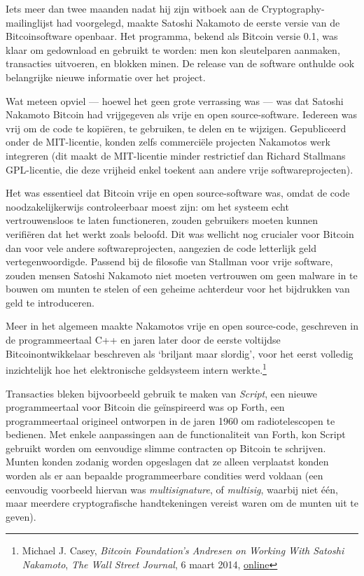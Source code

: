 \documentclass[
  a5paper,
  smalldemyvopaper,11pt,twoside,onecolumn,openright,extrafontsizes,
hidelinks]{memoir}
\begin{document}
Iets meer dan twee maanden nadat hij zijn witboek aan de
Cryptography-mailinglijst had voorgelegd, maakte Satoshi Nakamoto de
eerste versie van de Bitcoinsoftware openbaar. Het programma, bekend als
Bitcoin versie 0.1, was klaar om gedownload en gebruikt te worden: men
kon sleutelparen aanmaken, transacties uitvoeren, en blokken minen. De
release van de software onthulde ook belangrijke nieuwe informatie over
het project.

Wat meteen opviel --- hoewel het geen grote verrassing was --- was dat
Satoshi Nakamoto Bitcoin had vrijgegeven als vrije en open
source-software. Iedereen was vrij om de code te kopiëren, te gebruiken,
te delen en te wijzigen. Gepubliceerd onder de MIT-licentie, konden
zelfs commerciële projecten Nakamotos werk integreren (dit maakt de
MIT-licentie minder restrictief dan Richard Stallmans GPL-licentie, die
deze vrijheid enkel toekent aan andere vrije softwareprojecten).

Het was essentieel dat Bitcoin vrije en open source-software was, omdat
de code noodzakelijkerwijs controleerbaar moest zijn: om het systeem
echt vertrouwensloos te laten functioneren, zouden gebruikers moeten
kunnen verifiëren dat het werkt zoals beloofd. Dit was wellicht nog
crucialer voor Bitcoin dan voor vele andere softwareprojecten, aangezien
de code letterlijk geld vertegenwoordigde. Passend bij de filosofie van
Stallman voor vrije software, zouden mensen Satoshi Nakamoto niet moeten
vertrouwen om geen malware in te bouwen om munten te stelen of een
geheime achterdeur voor het bijdrukken van geld te introduceren.

Meer in het algemeen maakte Nakamotos vrije en open source-code,
geschreven in de programmeertaal C++ en jaren later door de eerste
voltijdse Bitcoinontwikkelaar beschreven als `briljant maar slordig',
voor het eerst volledig inzichtelijk hoe het elektronische geldsysteem
intern werkte.\footnote{Michael J. Casey, \emph{Bitcoin Foundation's
  Andresen on Working With Satoshi Nakamoto}, \emph{The Wall Street
  Journal}, 6 maart 2014,
  \href{https://www.wsj.com/articles/BL-MBB-17626}{online}}

Transacties bleken bijvoorbeeld gebruik te maken van \emph{Script}, een
nieuwe programmeertaal voor Bitcoin die geïnspireerd was op Forth, een
programmeertaal origineel ontworpen in de jaren 1960 om radiotelescopen
te bedienen. Met enkele aanpassingen aan de functionaliteit van Forth,
kon Script gebruikt worden om eenvoudige slimme contracten op Bitcoin te
schrijven. Munten konden zodanig worden opgeslagen dat ze alleen
verplaatst konden worden als er aan bepaalde programmeerbare condities
werd voldaan (een eenvoudig voorbeeld hiervan was \emph{multisignature},
of \emph{multisig}, waarbij niet één, maar meerdere cryptografische
handtekeningen vereist waren om de munten uit te geven).
\end{document}
